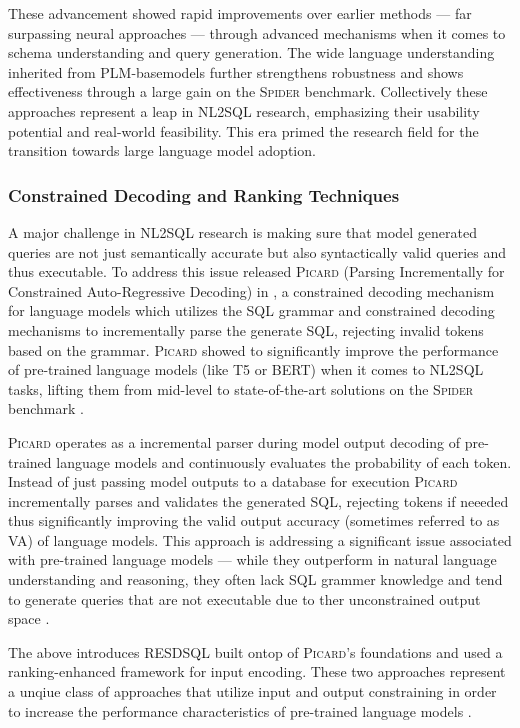 These advancement showed rapid improvements over earlier methods — far surpassing neural approaches — through advanced
mechanisms when it comes to schema understanding and query generation. The wide language understanding inherited from
PLM-basemodels further strengthens robustness and shows effectiveness through a large gain on the \textsc{Spider}
benchmark. Collectively these approaches represent a leap in NL2SQL research, emphasizing their usability potential
and real-world feasibility. This era primed the research field for the transition towards large language model adoption.

\subsubsection{Constrained Decoding and Ranking Techniques}

A major challenge in NL2SQL research is making sure that model generated queries are not just semantically accurate
but also syntactically valid queries and thus executable. To address this issue \citeauthor*{PICARD} released \textsc{Picard}
(Parsing Incrementally for Constrained Auto-Regressive Decoding) in \citeyear{PICARD}, a constrained decoding mechanism
for language models which utilizes the SQL grammar and constrained decoding mechanisms to incrementally parse the generate SQL,
rejecting invalid tokens based on the grammar. \textsc{Picard} showed to significantly improve the performance of pre-trained
language models (like T5 or BERT) when it comes to NL2SQL tasks, lifting them from mid-level to state-of-the-art solutions
on the \textsc{Spider} benchmark \citep{PICARD}.

\textsc{Picard} operates as a incremental parser during model output decoding of pre-trained language models and continuously
evaluates the probability of each token. Instead of just passing model outputs to a database for execution \textsc{Picard}
incrementally parses and validates the generated SQL, rejecting tokens if neeeded thus significantly improving the valid
output accuracy (sometimes referred to as VA) of language models. This approach is addressing a significant issue associated
with pre-trained language models — while they outperform in natural language understanding and reasoning, they often lack
SQL grammer knowledge and tend to generate queries that are not executable due to ther unconstrained output space \citep{PICARD}.

The above introduces RESDSQL built ontop of \textsc{Picard}'s foundations and used a ranking-enhanced framework for input
encoding. These two approaches represent a unqiue class of approaches that utilize input and output constraining in order
to increase the performance characteristics of pre-trained language models \citep{RESDSQL}.

